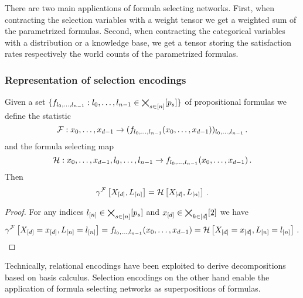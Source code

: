 There are two main applications of formula selecting networks.
First, when contracting the selection variables with a weight tensor we get a weighted sum of the parametrized formulas.
Second, when contracting the categorical variables with a distribution or a knowledge base, we get a tensor storing the satisfaction rates respectively the world counts of the parametrized formulas.

\subsubsection{Representation of selection encodings}


\begin{lemma}\label{lem:relToSelFSN}
	Given a set $\{f_{l_{0},\ldots,l_{n-1}} : l_{0},\ldots,l_{n-1}\in\bigtimes_{s\in[n]}[p_{s}]\}$ of propositional formulas we define the statistic
		 \[ \mathcal{F} : x_{0},\ldots,x_{d-1} \rightarrow (f_{l_{0},\ldots,l_{n-1}}(x_{0},\ldots,x_{d-1}))_{l_{0},\ldots,l_{n-1}} \, . \]
	and the formula selecting map
		\[ \mathcal{H}: x_{0},\ldots,x_{d-1} , l_{0},\ldots,l_{n-1} \rightarrow f_{l_{0},\ldots,l_{n-1}} (x_{0},\ldots,x_{d-1}) \, . \]
	Then 
		\[ \gamma^{\mathcal{F}}\left[X_{[d]}, L_{[n]}\right] = \mathcal{H}\left[X_{[d]}, L_{[n]} \right] \, .  \]
\end{lemma}
\begin{proof}
	For any indices $l_{[n]}\in\bigtimes_{s\in[n]}[p_{s}]$ and $x_{[d]}\in\bigtimes_{k\in[d]}[2]$ we have
	\begin{align*}
		\gamma^{\mathcal{F}}\left[X_{[d]}=x_{[d]}, L_{[n]}=l_{[n]}\right]
		=  f_{l_{0},\ldots,l_{n-1}}(x_{0},\ldots,x_{d-1}) =  \mathcal{H}\left[X_{[d]}=x_{[d]}, L_{[n]}=l_{[n]} \right] \, . 
	\end{align*}
\end{proof}

Technically, relational encodings have been exploited to derive decompositions based on basis calculus.
Selection encodings on the other hand enable the application of formula selecting networks as superpositions of formulas.



